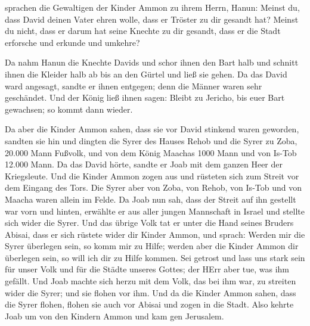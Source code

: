  sprachen die Gewaltigen der Kinder Ammon zu ihrem Herrn,
Hanun: Meinst du, dass David deinen Vater ehren wolle, dass er Tröster
zu dir gesandt hat? Meinst du nicht, dass er darum hat seine Knechte zu
dir gesandt, dass er die Stadt erforsche und erkunde und umkehre?

 Da nahm Hanun die Knechte Davids und schor ihnen den Bart
halb und schnitt ihnen die Kleider halb ab bis an den Gürtel und ließ
sie gehen.  Da das David ward angesagt, sandte er ihnen
entgegen; denn die Männer waren sehr geschändet. Und der König ließ
ihnen sagen: Bleibt zu Jericho, bis euer Bart gewachsen; so kommt dann
wieder.

 Da aber die Kinder Ammon sahen, dass sie vor David stinkend
waren geworden, sandten sie hin und dingten die Syrer des Hauses Rehob
und die Syrer zu Zoba, 20.000 Mann Fußvolk, und von dem König Maachas
1000 Mann und von Is-Tob 12.000 Mann.  Da das David hörte,
sandte er Joab mit dem ganzen Heer der Kriegsleute.  Und die
Kinder Ammon zogen aus und rüsteten sich zum Streit vor dem Eingang des
Tors. Die Syrer aber von Zoba, von Rehob, von Is-Tob und von Maacha
waren allein im Felde.  Da Joab nun sah, dass der Streit auf
ihn gestellt war vorn und hinten, erwählte er aus aller jungen
Mannschaft in Israel und stellte sich wider die Syrer.  Und
das übrige Volk tat er unter die Hand seines Bruders Abisai, dass er
sich rüstete wider dir Kinder Ammon,  und sprach: Werden
mir die Syrer überlegen sein, so komm mir zu Hilfe; werden aber die
Kinder Ammon dir überlegen sein, so will ich dir zu Hilfe kommen.
 Sei getrost und lass uns stark sein für unser Volk und für
die Städte unseres Gottes; der HErr aber tue, was ihm gefällt.
 Und Joab machte sich herzu mit dem Volk, das bei ihm war,
zu streiten wider die Syrer; und sie flohen vor ihm.  Und
da die Kinder Ammon sahen, dass die Syrer flohen, flohen sie auch vor
Abisai und zogen in die Stadt. Also kehrte Joab um von den Kindern Ammon
und kam gen Jerusalem.


